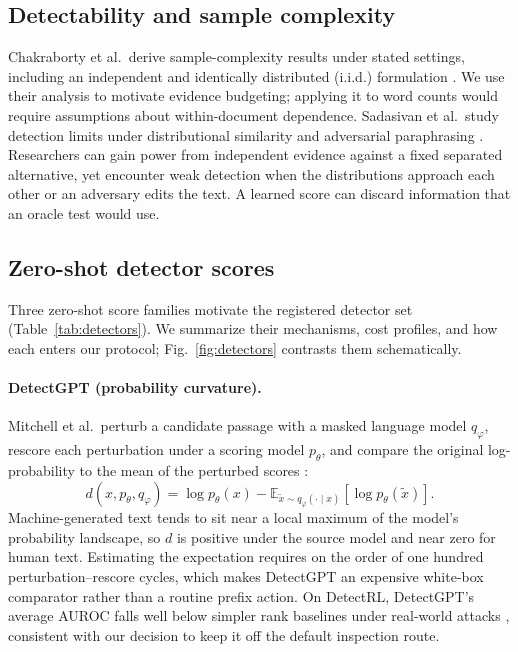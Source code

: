 \documentclass[pdflatex,sn-mathphys-num]{sn-jnl}
\newcommand{\Expect}{\mathbb{E}}
\begin{document}
\subsection{Detectability and sample complexity}

Chakraborty et al.\ derive sample-complexity results under stated settings, including an independent and identically distributed (i.i.d.) formulation \citep{chakraborty2024}. We use their analysis to motivate evidence budgeting; applying it to word counts would require assumptions about within-document dependence. Sadasivan et al.\ study detection limits under distributional similarity and adversarial paraphrasing \citep{sadasivan2025}. Researchers can gain power from independent evidence against a fixed separated alternative, yet encounter weak detection when the distributions approach each other or an adversary edits the text. A learned score can discard information that an oracle test would use.

\subsection{Zero-shot detector scores}\label{sec:detectors}

Three zero-shot score families motivate the registered detector set (Table~\ref{tab:detectors}). We summarize their mechanisms, cost profiles, and how each enters our protocol; Fig.~\ref{fig:detectors} contrasts them schematically.

\paragraph*{DetectGPT (probability curvature).}
Mitchell et al.\ perturb a candidate passage with a masked language model \(q_\varphi\), rescore each perturbation under a scoring model \(p_\theta\), and compare the original log-probability to the mean of the perturbed scores \citep{mitchell2023}:
\begin{equation}
 d(x,p_\theta,q_\varphi)=\log p_\theta(x)
 -\Expect_{\tilde x\sim q_\varphi(\cdot\mid x)}[\log p_\theta(\tilde x)].
 \label{eq:detectgpt}
\end{equation}
Machine-generated text tends to sit near a local maximum of the model's probability landscape, so \(d\) is positive under the source model and near zero for human text. Estimating the expectation requires on the order of one hundred perturbation--rescore cycles, which makes DetectGPT an expensive white-box comparator rather than a routine prefix action. On DetectRL, DetectGPT's average AUROC falls well below simpler rank baselines under real-world attacks \citep{wu2024}, consistent with our decision to keep it off the default inspection route.
\end{document}
